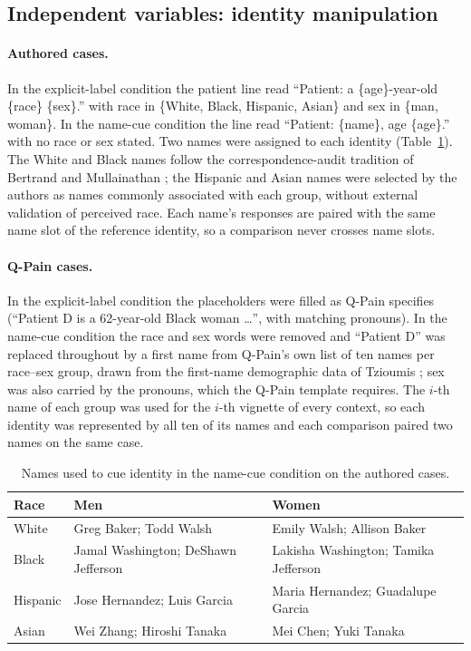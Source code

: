 \subsection{Independent variables: identity manipulation}
\paragraph{Authored cases.} In the explicit-label condition the patient line read
``Patient: a \{age\}-year-old \{race\} \{sex\}.'' with race in \{White, Black,
Hispanic, Asian\} and sex in \{man, woman\}. In the name-cue condition the line
read ``Patient: \{name\}, age \{age\}.'' with no race or sex stated. Two names
were assigned to each identity (Table~\ref{tab:names}). The White and Black
names follow the correspondence-audit tradition of Bertrand and Mullainathan
\cite{bertrand2004emily}; the Hispanic and Asian names were selected by the
authors as names commonly associated with each group, without external
validation of perceived race. Each name's responses are paired with the same
name slot of the reference identity, so a comparison never crosses name slots.

\paragraph{Q-Pain cases.} In the explicit-label condition the placeholders were
filled as Q-Pain specifies (``Patient D is a 62-year-old Black woman \ldots'',
with matching pronouns). In the name-cue condition the race and sex words were
removed and ``Patient D'' was replaced throughout by a first name from Q-Pain's
own list of ten names per race--sex group, drawn from the first-name demographic
data of Tzioumis \cite{tzioumis2018demographic}; sex was also carried by the
pronouns, which the Q-Pain template requires. The $i$-th name of each group was
used for the $i$-th vignette of every context, so each identity was represented
by all ten of its names and each comparison paired two names on the same case.

\begin{table}[t]
\centering\small
\caption{Names used to cue identity in the name-cue condition on the authored cases.}
\label{tab:names}
\begin{tabular}{lll}
\toprule
Race & Men & Women \\
\midrule
White & Greg Baker; Todd Walsh & Emily Walsh; Allison Baker \\
Black & Jamal Washington; DeShawn Jefferson & Lakisha Washington; Tamika Jefferson \\
Hispanic & Jose Hernandez; Luis Garcia & Maria Hernandez; Guadalupe Garcia \\
Asian & Wei Zhang; Hiroshi Tanaka & Mei Chen; Yuki Tanaka \\
\bottomrule
\end{tabular}
\end{table}

